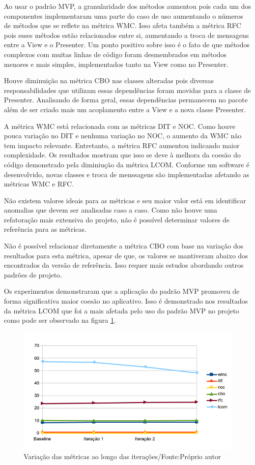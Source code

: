 Ao usar o padrão MVP, a granularidade dos métodos aumentou pois cada um dos
componentes implementaram uma parte do caso de uso aumentando o números de
métodos que se reflete na métrica WMC. Isso afeta também a métrica RFC pois
esses métodos estão relacionados entre si, aumentando a troca de mensagens entre
a View e o Presenter. Um ponto positivo sobre isso é o fato de que métodos 
complexos com muitas linhas de código foram desmembrados em métodos menores e
mais simples, implementados tanto na View como no Presenter.

Houve diminuição na métrica CBO nas classes alteradas pois diversas
responsabilidades que utilizam essas dependências foram movidas para a classe de
Presenter. Analisando de forma geral, essas dependências permanecem no pacote
além de ser criado mais um acoplamento entre a View e a nova classe Presenter.

A métrica WMC está relacionada com as métricas DIT e NOC. Como houve pouca
variação no DIT e nenhuma variação no NOC, o aumento da WMC não tem impacto
relevante. Entretanto, a métrica RFC aumentou indicando maior complexidade. Os
resultados mostram que isso se deve à melhora da coesão do código demonstrado pela
diminiução da métrica LCOM. Conforme um software é desenvolvido, novas classes e
troca de menssagens são implementadas afetando as métricas WMC e RFC. 

Não existem valores ideais para as métricas e seu maior valor está em
identificar anomalias que devem ser analisadas caso a caso. Como não houve uma refatoração
mais extensiva do projeto, não é possível determinar valores de referência para
as métricas. 

Não é possível relacionar diretamente a métrica CBO com base na
variação dos resultados para esta métrica, apesar de que, os valores se
mantiveram abaixo dos encontrados da versão de referência.
Isso requer mais estudos abordando outros padrões de projeto. 

Os experimentos demonstraram que a aplicação do padrão MVP promoveu de forma
significativa maior coesão no aplicativo. Isso é demonstrado nos resultados da
métrica LCOM que foi a mais afetada pelo uso do padrão MVP no projeto como pode
ser observado na figura \ref{fig:allmetrics}.

\begin{figure}[!h]
	\centering
	\includegraphics{img/allmetrics}
	\caption[Variação das métricas ao longo das iterações]{Variação das métricas ao
	longo das iterações/Fonte:Próprio autor}
	\label{fig:allmetrics}
\end{figure}

